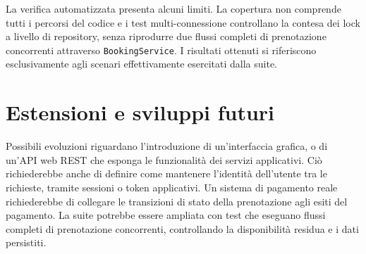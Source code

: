 La verifica automatizzata presenta alcuni limiti. La copertura non comprende tutti i percorsi del codice e i test multi-connessione controllano la contesa dei lock a livello di repository, senza riprodurre due flussi completi di prenotazione concorrenti attraverso \texttt{BookingService}. I risultati ottenuti si riferiscono esclusivamente agli scenari effettivamente esercitati dalla suite.


\section{Estensioni e sviluppi futuri}
\label{sec:sviluppi-futuri}
Possibili evoluzioni riguardano l'introduzione di un'interfaccia grafica, o di un'API web REST che esponga le funzionalità dei servizi applicativi. Ciò richiederebbe anche di definire come mantenere l'identità dell'utente tra le richieste, tramite sessioni o token applicativi. Un sistema di pagamento reale richiederebbe di collegare le transizioni di stato della prenotazione agli esiti del pagamento. La suite potrebbe essere ampliata con test che eseguano flussi completi di prenotazione concorrenti, controllando la disponibilità residua e i dati persistiti.
